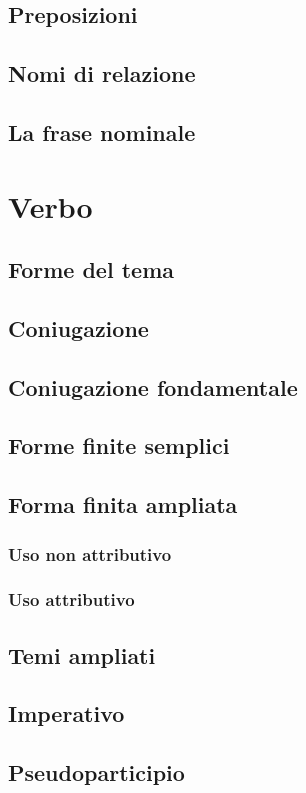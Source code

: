 \documentclass[11pt,a4paper]{amsart}
\begin{document}
\subsection{Preposizioni}
\subsection{Nomi di relazione}
\subsection{La frase nominale}
\section{Verbo}
\subsection{Forme del tema}
\subsection{Coniugazione}
\subsection{Coniugazione fondamentale}
\subsection{Forme finite semplici}
\subsection{Forma finita ampliata}
\subsubsection{Uso non attributivo}
\subsubsection{Uso attributivo}
\subsection{Temi ampliati}
\subsection{Imperativo}
\subsection{Pseudoparticipio}
\end{document}
